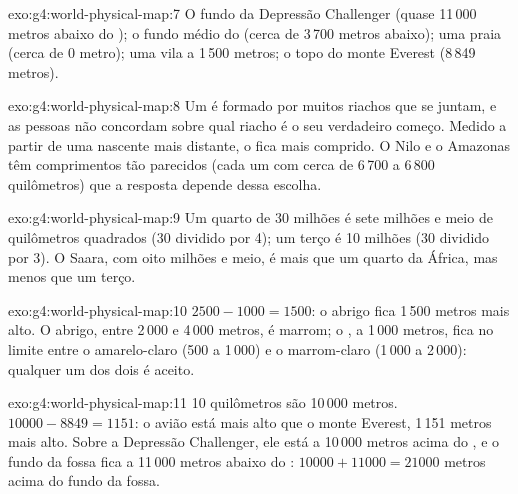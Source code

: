 \begin{solution}{exo:g4:world-physical-map:7}
O fundo da Depressão Challenger (quase 11\,000 metros abaixo do ); o fundo médio do  (cerca de 3\,700 metros abaixo); uma praia
(cerca de 0 metro); uma vila a 1\,500 metros; o topo do monte Everest
(8\,849 metros).
\end{solution}

\begin{solution}{exo:g4:world-physical-map:8}
Um  é formado por muitos riachos que se juntam, e as pessoas não
concordam sobre qual riacho é o seu verdadeiro começo. Medido a partir de
uma nascente mais distante, o  fica mais comprido. O Nilo e o Amazonas
têm comprimentos tão parecidos (cada um com cerca de 6\,700 a 6\,800
quilômetros) que a resposta depende dessa escolha.
\end{solution}

\begin{solution}{exo:g4:world-physical-map:9}
Um quarto de 30 milhões é sete milhões e meio de quilômetros quadrados (30
dividido por 4); um terço é 10 milhões (30 dividido por 3). O Saara, com
oito milhões e meio, é mais que um quarto da África, mas menos que um
terço.
\end{solution}

\begin{solution}{exo:g4:world-physical-map:10}
$2500 - 1000 = 1500$: o abrigo fica 1\,500 metros mais alto. O abrigo, entre
2\,000 e 4\,000 metros, é marrom; o , a 1\,000 metros, fica no limite
entre o amarelo-claro (500 a 1\,000) e o marrom-claro (1\,000 a 2\,000):
qualquer um dos dois é aceito.
\end{solution}

\begin{solution}{exo:g4:world-physical-map:11}
10 quilômetros são 10\,000 metros. $10000 - 8849 = 1151$: o avião está mais
alto que o monte Everest, 1\,151 metros mais alto. Sobre a Depressão
Challenger, ele está a 10\,000 metros acima do , e o fundo da fossa fica
a 11\,000 metros abaixo do : $10000 + 11000 = 21000$ metros acima do
fundo da fossa.
\end{solution}
